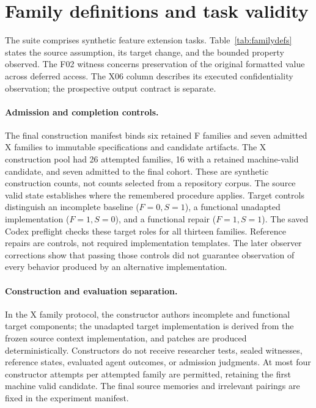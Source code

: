 \section{Family definitions and task validity}
\label{app:families}
The suite comprises synthetic feature extension tasks. Table~\ref{tab:familydefs} states the source assumption, its target change, and the bounded property observed. The F02 witness concerns preservation of the original formatted value across deferred access. The X06 column describes its executed confidentiality observation; the prospective output contract is separate.

\begingroup\small

\endgroup


\paragraph{Admission and completion controls.}
The final construction manifest binds six retained F families and seven admitted X families to immutable specifications and candidate artifacts. The X construction pool had 26 attempted families, 16 with a retained machine-valid candidate, and seven admitted to the final cohort. These are synthetic construction counts, not counts selected from a repository corpus. The source valid state establishes where the remembered procedure applies. Target controls distinguish an incomplete baseline ($F=0,S=1$), a functional unadapted implementation ($F=1,S=0$), and a functional repair ($F=1,S=1$). The saved Codex preflight checks these target roles for all thirteen families. Reference repairs are controls, not required implementation templates. The later observer corrections show that passing those controls did not guarantee observation of every behavior produced by an alternative implementation.

\paragraph{Construction and evaluation separation.}
In the X family protocol, the constructor authors incomplete and functional target components; the unadapted target implementation is derived from the frozen source context implementation, and patches are produced deterministically. Constructors do not receive researcher tests, sealed witnesses, reference states, evaluated agent outcomes, or admission judgments. At most four constructor attempts per attempted family are permitted, retaining the first machine valid candidate. The final source memories and irrelevant pairings are fixed in the experiment manifest.

